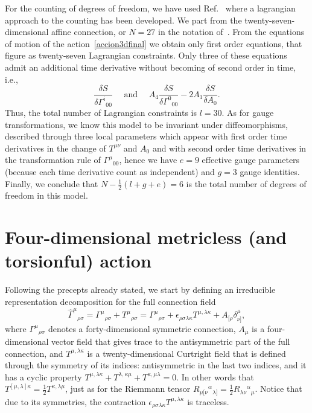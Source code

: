 \documentclass{ws-mpla}
\renewcommand{\(}{\left(}
\renewcommand{\)}{\right)}
\renewcommand{\[}{\left[}
\renewcommand{\]}{\right]}
\begin{document}
For the counting of degrees of freedom, we have used Ref.~ where a lagrangian approach to the counting has been developed. We part from the twenty-seven-dimensional affine connection, or $N = 27$ in the notation of~.  From the equations of motion of the action~\eqref{accion3dfinal} we obtain only first order equations, that figure as twenty-seven Lagrangian constraints. Only three of these equations admit an additional time derivative without becoming of second order in time,  i.e., 
\begin{equation*}
  \frac{\delta S}{\delta\Gamma^i{}_{00}} \quad \text{ and } \quad A_4 \frac{\delta S}{\delta\Gamma^0{}_{00}} - 2 A_1 \frac{\delta S}{\delta A_{0}}.
\end{equation*}
Thus, the total number of Lagrangian constraints is \mbox{$l=30$.} As for gauge transformations, we know this model to be invariant under diffeomorphisms, described through three local parameters which appear with first order time derivatives in the change of $T^{\mu\nu}$ and $ A_0$ and with second order time derivatives in the transformation rule of $\Gamma^\mu{}_{00} $, hence we have $e=9$ effective gauge parameters (because each time derivative count as independent) and $g=3$ gauge identities. Finally,  we conclude that   \mbox{$N-\frac{1}{2}(l+g+e) = 6$} is the total number of degrees of freedom in this model. 


\section{\label{sec:4} Four-dimensional metricless (and torsionful) action}

Following the precepts  already stated, we start  by defining an irreducible representation decomposition for the full connection field 
\begin{equation}
  \hat{\Gamma}^\mu{}_{\rho\sigma} = {\Gamma}^\mu{}_{\rho\sigma} + T^\mu{}_{\rho\sigma} = {\Gamma}^\mu{}_{\rho\sigma} + \epsilon_{\rho\sigma\lambda\kappa}T^{\mu,\lambda\kappa}+A_{[\rho}\delta^\mu_{\nu]},
\end{equation}
where ${\Gamma}^\mu{}_{\rho\sigma}$ denotes a forty-dimensional symmetric connection, $A_\mu$ is a four-dimensional vector field  that gives trace to the antisymmetric part of the full connection, and  $T^{\mu,\lambda\kappa}$ is a twenty-dimensional Curtright field\cite{Curtright:1980yk} that is defined through the symmetry of its indices: antisymmetric in the last two indices, and it has a cyclic property $T^{\mu,\lambda\kappa}+T^{\lambda,\kappa\mu}+T^{\kappa,\mu\lambda}=0$. In other words that $T^{[\mu,\lambda]\kappa}=\frac{1}{2}T^{\kappa,\lambda\mu}$, just as for  the Riemmann tensor ${R}_{\mu[\nu}{}^\alpha{}_{\lambda]}=\frac{1}{2}{R}_{\lambda\nu}{}^\alpha{}_{\mu}$. Notice that due to its symmetries, the contraction $\epsilon_{\rho\sigma\lambda\kappa}T^{\mu,\lambda\kappa}$ is traceless.
\end{document}
